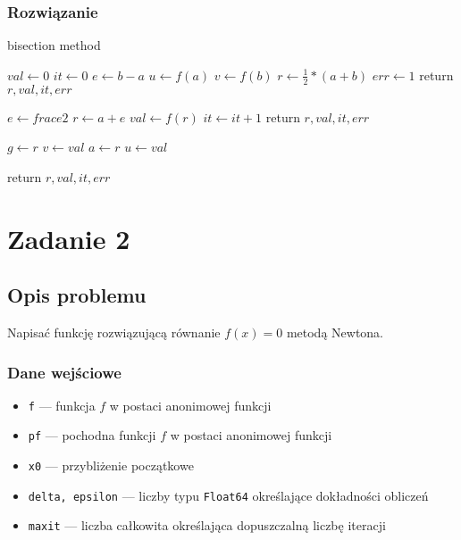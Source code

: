\documentclass{article}
\begin{document}
\subsubsection*{Rozwiązanie}
	\begin{algorithm}[H]
	\caption{bisection method}
	\begin{algorithmic}
		\State $val \gets 0$
        \State $it \gets 0$
        \State $e \gets b - a$
        \State $u \gets f(a)$
        \State $v \gets f(b)$
        \State $r \gets \frac{1}{2} * (a + b)$
        	\State $err \gets 1$
        	\State return $r, val, it, err$
        \EndIf

        	\State $e \gets frac{e}{2}$
        	\State $r \gets a + e$
        	\State $val \gets f(r)$
        	\State $it \gets it + 1$
        		\State return $r, val, it, err$
        	\EndIf

        		\State $g \gets r$
        		\State $v \gets val$
        	\Else
        		\State $a \gets r$
        		\State $u \gets val$
        	\EndIf
        \EndWhile

        \State return $r, val, it, err$
    \end{algorithmic}
    \end{algorithm}

\section*{Zadanie 2}
\subsection*{Opis problemu}
	Napisać funkcję rozwiązującą równanie $f(x) = 0$ metodą Newtona.
\subsubsection*{Dane wejściowe}
	\begin{itemize}
	    \item \texttt{f} — funkcja $f$ w postaci anonimowej funkcji
	    \item \texttt{pf} — pochodna funkcji $f$ w postaci anonimowej funkcji
	    \item \texttt{x0} — przybliżenie początkowe
	    \item \texttt{delta, epsilon} — liczby typu \texttt{Float64} określające dokładności obliczeń
	    \item \texttt{maxit} — liczba całkowita określająca dopuszczalną liczbę iteracji
	\end{itemize}
\end{document}
